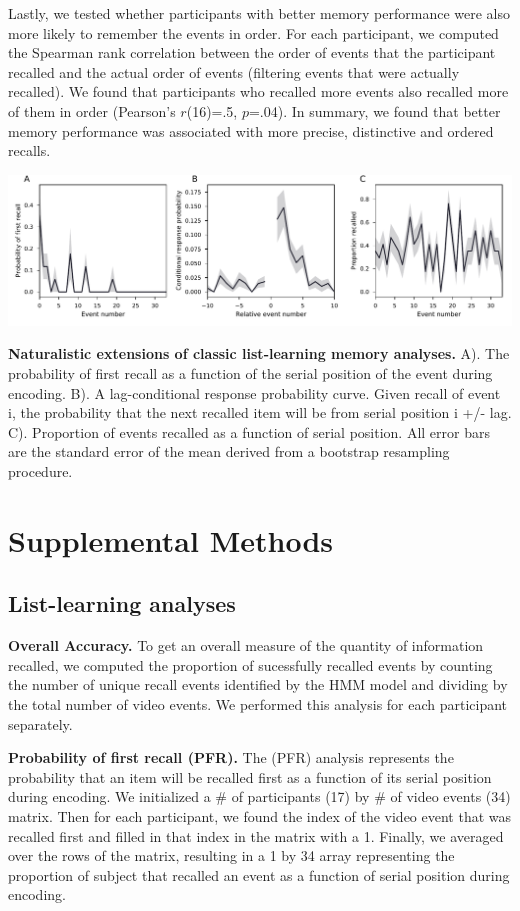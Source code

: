 \documentclass{article}
\begin{document}
{Lastly, we tested whether participants with better memory performance were also more likely to remember the events in order.  For each participant, we computed the Spearman rank correlation between the order of events that the participant recalled and the actual order of events (filtering events that were actually recalled).  We found that participants who recalled more events also recalled more of them in order (Pearson's $r$(16)=.5, $p$=.04). In summary, we found that better memory performance was associated with more precise, distinctive and ordered recalls.

\begin{suppfigure}[t!]
\centering
\includegraphics[width=1\textwidth]{figs/supp3_list_learning.pdf}
\caption{\small \textbf{Naturalistic extensions of classic list-learning memory analyses.} A). The probability of first recall as a function of the serial position of the event during encoding. B). A lag-conditional response probability curve. Given recall of event i, the probability that the next recalled item will be from serial position i +/- lag. C). Proportion of events recalled as a function of serial position. All error bars are the standard error of the mean derived from a bootstrap resampling procedure.}
\label{fig:list-learning}
\end{suppfigure}

\section{Supplemental Methods}
\subsection{List-learning analyses}
\textbf{Overall Accuracy.}  To get an overall measure of the quantity of information recalled, we computed the proportion of sucessfully recalled events by counting the number of unique recall events identified by the HMM model and dividing by the total number of video events.  We performed this analysis for each participant separately.

\textbf{Probability of first recall (PFR).}  The (PFR) analysis represents the probability that an item will be recalled first as a function of its serial position during encoding. We initialized a \# of participants (17) by \# of video events (34) matrix. Then for each participant, we found the index of the video event that was recalled first and filled in that index in the matrix with a 1.  Finally, we averaged over the rows of the matrix, resulting in a 1 by 34 array representing the proportion of subject that recalled an event as a function of serial position during encoding.

}
\end{document}
